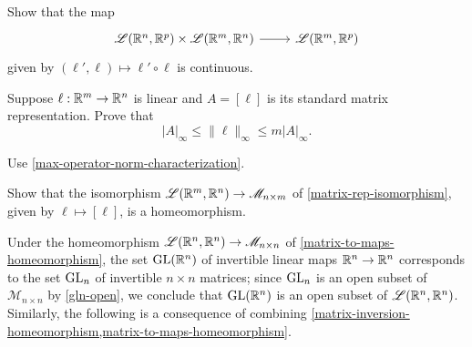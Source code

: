 \begin{exercise} \label{composition-continuous}
	Show that the map
	\[ \begin{tikzcd} \mathscr{L}(\R^n, \R^p) \times \mathscr{L}(\R^m, \R^n) \ar{r} & \mathscr{L}(\R^m, \R^p) \end{tikzcd} \]
	given by $(\ell', \ell) \mapsto \ell' \circ \ell$ is continuous. 
\end{exercise}

\begin{exercise} \label{max-matrix-norm-and-max-operator-norm}
	Suppose $\ell : \mathbb{R}^m \to \mathbb{R}^n$ is linear and $A = [\ell]$ is its standard matrix representation. Prove that 
	\[ |A|_\infty \leq \|\ell\|_\infty \leq m |A|_\infty. \]
	\begin{hint}
		Use \cref{max-operator-norm-characterization}.
	\end{hint}
\end{exercise}

\begin{exercise} \label{matrix-to-maps-homeomorphism} 
	Show that the isomorphism $\mathscr{L}(\mathbb{R}^m, \mathbb{R}^n) \to \mathscr{M}_{n \times m}$ of \cref{matrix-rep-isomorphism}, given by $\ell \mapsto [\ell]$, is a homeomorphism. 
\end{exercise}

Under the homeomorphism $\mathscr{L}(\mathbb{R}^n, \mathbb{R}^n) \to \mathscr{M}_{n \times n}$ of \cref{matrix-to-maps-homeomorphism}, the set $\operatorname{GL}(\mathbb{R}^n)$ of invertible linear maps $\mathbb{R}^n \to \mathbb{R}^n$ corresponds to the set $\operatorname{GL}_n$ of invertible $n \times n$ matrices; since $\operatorname{GL}_n$ is an open subset of $\mathscr{M}_{n \times n}$ by  \cref{gln-open}, we conclude that $\operatorname{GL}(\mathbb{R}^n)$ is an open subset of $\mathscr{L}(\mathbb{R}^n, \mathbb{R}^n)$. Similarly, the following is a consequence of combining \cref{matrix-inversion-homeomorphism,matrix-to-maps-homeomorphism}. 

